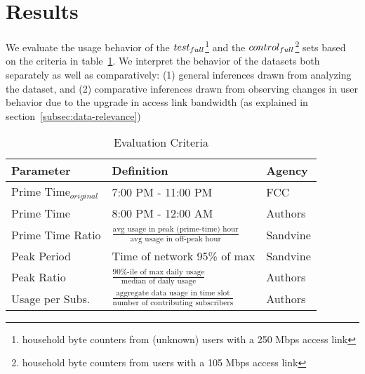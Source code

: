 \section{Results}
\label{sec:results}

We evaluate the usage behavior of the $test_{full}$\footnote{household byte counters
from (unknown) users with a 250 Mbps access link}  and the $control_{full}$\footnote{household
byte counters from users with a 105 Mbps access link} sets based
on the criteria in table~\ref{tab:eval-criteria}. We interpret the behavior of the datasets
both separately as well as comparatively: (1) general inferences drawn from analyzing the dataset,
and (2) comparative inferences drawn from observing changes in user behavior due to the upgrade
in access link bandwidth (as explained in section~\ref{subsec:data-relevance})

\begin{table}[ht!]
\small 
\begin{tabular}{|l|l|l|}
\hline
\textbf{Parameter}				& \textbf{Definition}				& \textbf{Agency}  \\ \hline
Prime Time$_{original}$			& 7:00 PM - 11:00 PM				& FCC       \\
Prime Time       				& 8:00 PM - 12:00 AM                & Authors       \\
Prime Time Ratio 				& \( \frac{ \text{avg usage in peak (prime-time) hour}}{ \text{avg usage in off-peak hour}}\) 												& Sandvine  \\
Peak Period						& Time of network 95\% of max      	& Sandvine \\
Peak Ratio       				& \(\frac{\text{90\%-ile of max daily usage}}{\text{median of daily usage}}\)                											& Authors \\
Usage per Subs.       			& \(\frac{\text{aggregate data usage in time slot}}{\text{number of contributing subscribers}}\)                											& Authors \\ \hline
\end{tabular}
\caption{Evaluation Criteria}
\label{tab:eval-criteria}
\end{table}





%
